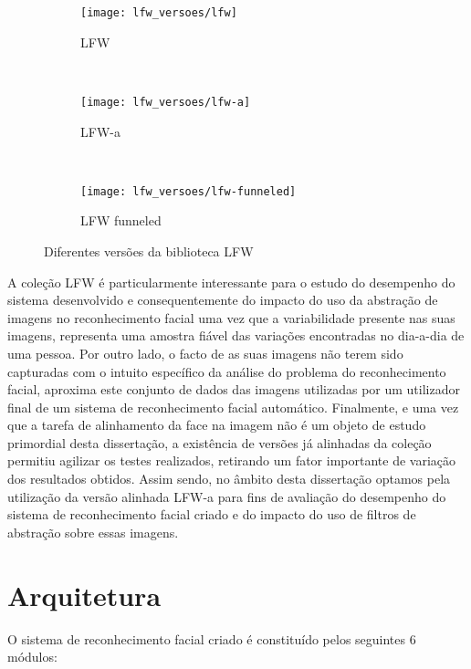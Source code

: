 \begin{figure}[h]
        \centering
        \begin{subfigure}[b]{0.25\textwidth}
                \centering
                \texttt{[image: lfw\_versoes/lfw]}
                \caption{LFW}
                \label{fig:lfw_original}
        \end{subfigure}%
        ~ 
        \begin{subfigure}[b]{0.25\textwidth}
                \centering
                \texttt{[image: lfw\_versoes/lfw-a]}
                \caption{LFW-a}
                \label{fig:lfw_a}
        \end{subfigure}
        ~ 
        \begin{subfigure}[b]{0.25\textwidth}
                \centering
                \texttt{[image: lfw\_versoes/lfw-funneled]}
                \caption{LFW funneled}
                \label{fig:lfw_funneled}
        \end{subfigure}
        \caption{Diferentes versões da biblioteca LFW}\label{fig:lfwversoes}
\end{figure}

A coleção LFW é particularmente interessante para o estudo do desempenho do sistema desenvolvido e consequentemente do impacto do uso da abstração de imagens no reconhecimento facial uma vez que a variabilidade presente nas suas imagens, representa uma amostra fiável das variações encontradas no dia-a-dia de uma pessoa. Por outro lado, o facto de as suas imagens não terem sido capturadas com o intuito específico da análise do problema do reconhecimento facial, aproxima este conjunto de dados das imagens utilizadas por um utilizador final de um sistema de reconhecimento facial automático. Finalmente, e uma vez que a tarefa de alinhamento da face na imagem não é um objeto de estudo primordial desta dissertação, a existência de versões já alinhadas da coleção permitiu agilizar os testes realizados, retirando um fator importante de variação dos resultados obtidos. Assim sendo, no âmbito desta dissertação optamos pela utilização da versão alinhada LFW-a para fins de avaliação do desempenho do sistema de reconhecimento facial criado e do impacto do uso de filtros de abstração sobre essas imagens.

\section{Arquitetura}
O sistema de reconhecimento facial criado é constituído pelos seguintes 6 módulos:

